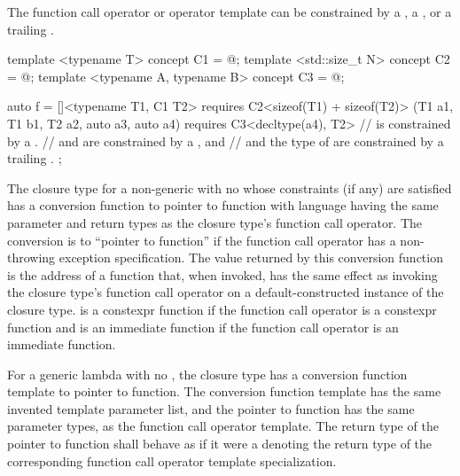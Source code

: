 \pnum
\begin{note}
The function call operator or operator template can be constrained
by a ,
a ,
or a trailing .
\begin{example}
\begin{codeblock}
template <typename T> concept C1 = @\commentellip@;
template <std::size_t N> concept C2 = @\commentellip@;
template <typename A, typename B> concept C3 = @\commentellip@;

auto f = []<typename T1, C1 T2> requires C2<sizeof(T1) + sizeof(T2)>
         (T1 a1, T1 b1, T2 a2, auto a3, auto a4) requires C3<decltype(a4), T2> {
  //  is constrained by a .
  //  and  are constrained by a , and
  //  and the type of  are constrained by a trailing .
};
\end{codeblock}
\end{example}
\end{note}

\pnum
The closure type for a non-generic  with no
whose constraints (if any) are satisfied
has a conversion function to pointer to
function with \Cpp{} language  having
the same parameter and return types as the closure type's function call operator.
The conversion is to ``pointer to  function''
if the function call operator
has a non-throwing exception specification.
The value returned by this conversion function
is the address of a function  that, when invoked,
has the same effect as invoking the closure type's function call operator
on a default-constructed instance of the closure type.
 is a constexpr function
if the function call operator is a constexpr function
and is an immediate function
if the function call operator is an immediate function.

\pnum
For a generic lambda with no , the closure type has a
conversion function template to
pointer to function. The conversion function template has the same invented
template parameter list, and the pointer to function has the same
parameter types, as the function call operator template.  The return type of
the pointer to function shall behave as if it were a
 denoting the return type of the corresponding
function call operator template specialization.

